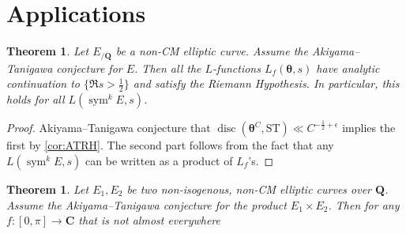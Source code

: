 \documentclass{article}
\DeclareMathOperator{\disc}{disc}
\DeclareMathOperator{\sym}{sym}
\newcommand{\bC}{\mathbf{C}}
\newcommand{\bQ}{\mathbf{Q}}
\newcommand{\btheta}{{\boldsymbol{\theta}}}
\newcommand{\ST}{\mathrm{ST}}
\newtheorem{theorem}[subsection]{Theorem}
\theoremstyle{definition}
\begin{document}
\section{Applications}\label{sec:application}

\begin{theorem}
Let $E_{/\bQ}$ be a non-CM elliptic curve. Assume the Akiyama--Tanigawa 
conjecture for $E$. Then all the $L$-functions $L_f(\btheta,s)$ have 
analytic continuation to $\{\Re s>\frac 1 2\}$ and satisfy the Riemann 
Hypothesis. In particular, this holds for all $L(\sym^k E,s)$. 
\end{theorem}
\begin{proof}
Akiyama--Tanigawa conjecture that 
$\disc(\btheta^C,\ST)\ll C^{-\frac 1 2+\epsilon}$ implies the first by
\autoref{cor:ATRH}. The second part follows from the fact that any 
$L(\sym^k E,s)$ can be written as a product of $L_f$'s. 
\end{proof}

\begin{theorem}
Let $E_1,E_2$ be two non-isogenous, non-CM elliptic curves over $\bQ$. 
Assume the Akiyama--Tanigawa conjecture for the product $E_1\times E_2$. 
Then for any $f\colon [0,\pi]\to \bC$ that is not almost everywhere 
\end{theorem}





\printbibliography
\end{document}
